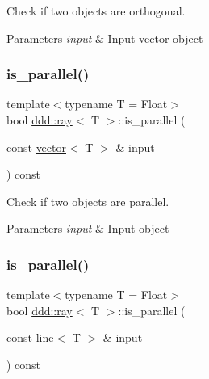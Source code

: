 Check if two objects are orthogonal. 


\begin{DoxyParams}{Parameters}
{\em input} & Input vector object \\
\hline
\end{DoxyParams}
\mbox{\label{classddd_1_1ray_aef973f5cd8130d1753b0059921e52649}} 
\subsubsection{\texorpdfstring{is\+\_\+parallel()}{is\_parallel()}\hspace{0.1cm}{\footnotesize\ttfamily [1/5]}}
{\footnotesize\ttfamily template$<$typename T = Float$>$ \\
bool \hyperlink{classddd_1_1ray}{ddd\+::ray}$<$ T $>$\+::is\+\_\+parallel (\begin{DoxyParamCaption}\item[{const \hyperlink{classddd_1_1vector}{vector}$<$ T $>$ \&}]{input }\end{DoxyParamCaption}) const\hspace{0.3cm}{\ttfamily [inline]}}



Check if two objects are parallel. 


\begin{DoxyParams}{Parameters}
{\em input} & Input object \\
\hline
\end{DoxyParams}
\mbox{\label{classddd_1_1ray_a2816e672b87910165cbcc6ed33414454}} 
\subsubsection{\texorpdfstring{is\+\_\+parallel()}{is\_parallel()}\hspace{0.1cm}{\footnotesize\ttfamily [2/5]}}
{\footnotesize\ttfamily template$<$typename T = Float$>$ \\
bool \hyperlink{classddd_1_1ray}{ddd\+::ray}$<$ T $>$\+::is\+\_\+parallel (\begin{DoxyParamCaption}\item[{const \hyperlink{classddd_1_1line}{line}$<$ T $>$ \&}]{input }\end{DoxyParamCaption}) const\hspace{0.3cm}{\ttfamily [inline]}}



